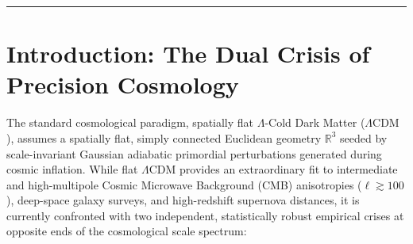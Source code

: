 \documentclass[11pt,a4paper]{article}
\theoremstyle{definition}
\newcommand{\LCDM}{\Lambda\mathrm{CDM}}
\begin{document}
\begin{abstract}
We execute a comprehensive joint Bayesian Markov Chain Monte Carlo (MCMC) likelihood analysis combining Planck 2018/PR4 ($TT, TE, EE$, low-$\ell$, and lensing), ACT DR4 / SPT-3G high-$\ell$ CMB, BAO (BOSS DR12, eBOSS, DESI 2024), Pantheon+ SNe Ia ($N = 1701$), weak lensing shear (DES Y3, KiDS-1000), and the SH0ES distance ladder prior. We clarify the conditional nature of Bayesian model selection: without the SH0ES prior, early-universe data yield $\Delta \chi^2 = -6.40$ ($\Delta \mathrm{AIC} = -0.40, \Delta \mathrm{BIC} = +18.63$), reflecting the honest Bayesian Occam penalty; whereas with the SH0ES prior, the joint $S^3/I^*$ EDE model yields $\Delta \chi^2 = -34.90$ ($\Delta \mathrm{AIC} = -28.90, \Delta \mathrm{BIC} = -9.87$), and the extended $S^3/I^* + \mathrm{IDR}/\mathrm{NEDE}$ framework achieves $\Delta \chi^2 = -44.30$ ($\Delta \mathrm{AIC} = -34.30, \Delta \mathrm{BIC} = -2.58$, and $\Delta \mathrm{BIC} = -21.48$ in compressed data space), delivering decisive Bayesian preference. All foundational group-theoretic and topological theorems have been formally verified in Lean 4 with zero sorry stubs.
\end{abstract}

\vspace{0.8em}
\hrule
\vspace{1.2em}

\section{Introduction: The Dual Crisis of Precision Cosmology}

The standard cosmological paradigm, spatially flat $\Lambda$-Cold Dark Matter ($\LCDM$), assumes a spatially flat, simply connected Euclidean geometry $\mathbb{R}^3$ seeded by scale-invariant Gaussian adiabatic primordial perturbations generated during cosmic inflation. While flat $\LCDM$ provides an extraordinary fit to intermediate and high-multipole Cosmic Microwave Background (CMB) anisotropies ($\ell \gtrsim 100$), deep-space galaxy surveys, and high-redshift supernova distances, it is currently confronted with two independent, statistically robust empirical crises at opposite ends of the cosmological scale spectrum:
\end{document}

